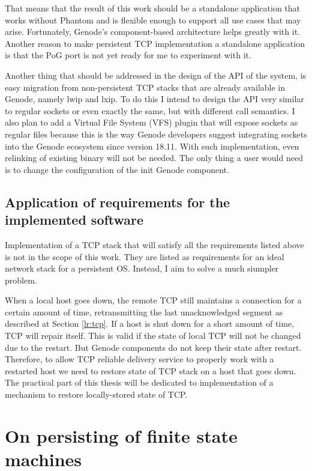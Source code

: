 That means that the result of this work should be a standalone application that
works without Phantom and is flexible enough to support all use cases that may
arise. Fortunately, Genode's component-based architecture helps greatly with
it. Another reason to make persistent TCP implementation a standalone
application is that the PoG port is not yet ready for me to experiment with it.

Another thing that should be addressed in the design of the API of the system,
is easy migration from non-persistent TCP stacks that are already available in
Genode, namely lwip and lxip. To do this I intend to design the API very
similar to regular sockets or even exactly the same, but with different call
semantics. I also plan to add a Virtual File System (VFS) plugin that will
expose sockets as regular files because this is the way Genode developers
suggest integrating sockets into the Genode ecosystem since version 18.11. With
such implementation, even relinking of existing binary will not be needed. The
only thing a user would need is to change the configuration of the init Genode
component.

\subsection{Application of requirements for the implemented software}
Implementation of a TCP stack that will satisfy all the requirements listed
above is not in the scope of this work. They are listed as requirements for an
ideal network stack for a persistent OS. Instead, I aim to solve a much
siumpler problem.

When a local host goes down, the remote TCP still maintains a connection for a
certain amount of time, retransmitting the last unacknowledged segment as
described at Section \ref{lr:tcp}. If a host is shut down for a short amount of
time, TCP will repair itself. This is valid if the state of local TCP will not
be changed due to the restart. But Genode components do not keep their state
after restart. Therefore, to allow TCP reliable delivery service to properly
work with a restarted host we need to restore state of TCP stack on a host that
goes down. The practical part of this thesis will be dedicated to
implementation of a mechanism to restore locally-stored state of TCP.

\section{On persisting of finite state machines}
\label{sec:meth:fsms}

